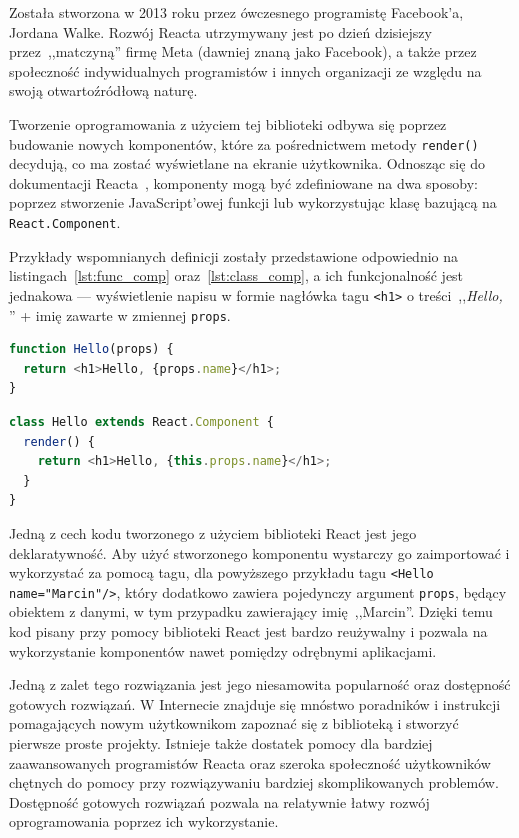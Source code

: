 \documentclass[twoside,a4paper]{report}
\begin{document}
Została stworzona w 2013 roku przez ówczesnego programistę Facebook'a, Jordana Walke.
Rozwój Reacta utrzymywany jest po dzień dzisiejszy przez~,,matczyną'' firmę Meta (dawniej znaną jako Facebook), a także przez społeczność indywidualnych programistów i innych organizacji ze względu na swoją otwartoźródłową naturę.

Tworzenie oprogramowania z użyciem tej biblioteki odbywa się poprzez budowanie nowych komponentów, które za pośrednictwem metody \texttt{render()} decydują, co ma zostać wyświetlane na ekranie użytkownika.
Odnosząc się do dokumentacji Reacta~\cite{reactdocs}, komponenty mogą być zdefiniowane na dwa sposoby: poprzez stworzenie JavaScript'owej funkcji lub wykorzystując klasę bazującą na \texttt{React.Component}.

Przykłady wspomnianych definicji zostały przedstawione odpowiednio na listingach~\ref{lst:func_comp} oraz~\ref{lst:class_comp}, a ich funkcjonalność jest jednakowa --- wyświetlenie napisu w formie nagłówka tagu \texttt{<h1>} o treści~,,\textit{Hello, }'' + imię zawarte w zmiennej \texttt{props}.

\begin{lstlisting}[caption={Funkcyjny komponent},label={lst:func_comp},language=JavaScript]
function Hello(props) {
  return <h1>Hello, {props.name}</h1>;
}
\end{lstlisting}
\begin{lstlisting}[caption={Klasowy komponent},label={lst:class_comp},language=JavaScript]
class Hello extends React.Component {
  render() {
    return <h1>Hello, {this.props.name}</h1>;
  }
}
\end{lstlisting}

Jedną z cech kodu tworzonego z użyciem biblioteki React jest jego deklaratywność.
Aby użyć stworzonego komponentu wystarczy go zaimportować i wykorzystać za pomocą tagu, dla powyższego przykładu tagu \texttt{<Hello name="Marcin"/>}, który dodatkowo zawiera pojedynczy argument \texttt{props}, będący obiektem z danymi, w tym przypadku zawierający imię~,,Marcin''.
Dzięki temu kod pisany przy pomocy biblioteki React jest bardzo reużywalny i pozwala na wykorzystanie komponentów nawet pomiędzy odrębnymi aplikacjami.

Jedną z zalet tego rozwiązania jest jego niesamowita popularność oraz dostępność gotowych rozwiązań.
W Internecie znajduje się mnóstwo poradników i instrukcji pomagających nowym użytkownikom zapoznać się z biblioteką i stworzyć pierwsze proste projekty.
Istnieje także dostatek pomocy dla bardziej zaawansowanych programistów Reacta oraz szeroka społeczność użytkowników chętnych do pomocy przy rozwiązywaniu bardziej skomplikowanych problemów.
Dostępność gotowych rozwiązań pozwala na relatywnie łatwy rozwój oprogramowania poprzez ich wykorzystanie.
\end{document}
